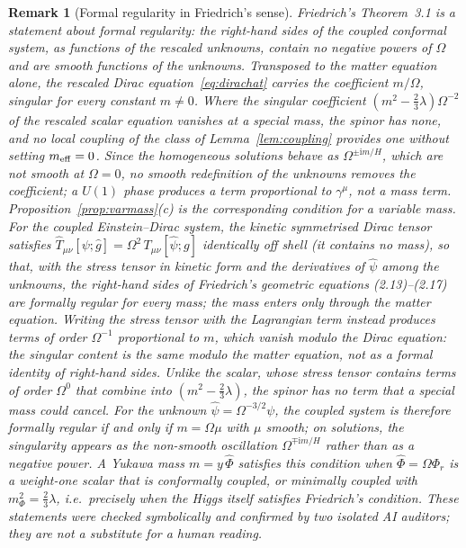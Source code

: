 \documentclass[11pt,a4paper]{article}
\newtheorem{remark}{Remark}
\theoremstyle{definition}
\newcommand{\ii}{\mathrm{i}}
\begin{document}
\begin{remark}[Formal regularity in Friedrich's sense]
\label{rem:friedrich}
Friedrich's Theorem~3.1 \cite{Friedrich2014} is a statement about formal regularity: the right-hand sides of the coupled conformal system, as functions of the rescaled unknowns, contain no negative powers of $\Omega$ and are smooth functions of the unknowns. Transposed to the matter equation alone, the rescaled Dirac equation~\eqref{eq:dirachat} carries the coefficient $m/\Omega$, singular for every constant $m\neq0$. Where the singular coefficient $(m^{2}-\tfrac23\lambda)\Omega^{-2}$ of the rescaled scalar equation vanishes at a special mass, the spinor has none, and no local coupling of the class of Lemma~\ref{lem:coupling} provides one without setting $m_{\rm eff}=0$. Since the homogeneous solutions behave as $\Omega^{\pm\ii m/H}$, which are not smooth at $\Omega=0$, no smooth redefinition of the unknowns removes the coefficient; a $U(1)$ phase produces a term proportional to $\gamma^{\mu}$, not a mass term. Proposition~\ref{prop:varmass}(c) is the corresponding condition for a variable mass. For the coupled Einstein--Dirac system, the kinetic symmetrised Dirac tensor satisfies $\hat T_{\mu\nu}[\psi;\hat g]=\Omega^{2}\,T_{\mu\nu}[\hat\psi;g]$ identically off shell (it contains no mass), so that, with the stress tensor in kinetic form and the derivatives of $\hat\psi$ among the unknowns, the right-hand sides of Friedrich's geometric equations (2.13)--(2.17) are formally regular for every mass; the mass enters only through the matter equation. Writing the stress tensor with the Lagrangian term instead produces terms of order $\Omega^{-1}$ proportional to $m$, which vanish modulo the Dirac equation: the singular content is the same modulo the matter equation, not as a formal identity of right-hand sides. Unlike the scalar, whose stress tensor contains terms of order $\Omega^{0}$ that combine into $(m^{2}-\tfrac23\lambda)$, the spinor has no term that a special mass could cancel. For the unknown $\hat\psi=\Omega^{-3/2}\psi$, the coupled system is therefore formally regular if and only if $m=\Omega\mu$ with $\mu$ smooth; on solutions, the singularity appears as the non-smooth oscillation $\Omega^{\mp\ii m/H}$ rather than as a negative power. A Yukawa mass $m=y\,\hat\Phi$ satisfies this condition when $\hat\Phi=\Omega\Phi_{r}$ is a weight-one scalar that is conformally coupled, or minimally coupled with $m_{\Phi}^{2}=\tfrac23\lambda$, i.e.\ precisely when the Higgs itself satisfies Friedrich's condition. These statements were checked symbolically and confirmed by two isolated AI auditors; they are not a substitute for a human reading.
\end{remark}
\end{document}
